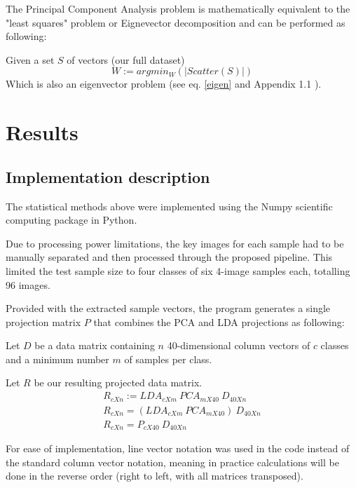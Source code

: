 \documentclass{bmvc2k}
\begin{document}
The Principal Component Analysis problem is mathematically equivalent to the "least squares" problem or Eignevector decomposition and can be performed as following:

Given a set $S$ of vectors (our full dataset)
\begin{equation}
   W := argmin_W(|Scatter(S)|)
\end{equation}
Which is also an eigenvector problem (see eq. \ref{eigen} and Appendix 1.1 \cite{appendix}).

\section{Results}

\subsection{Implementation description}

The statistical methods above were implemented using the Numpy\cite{numpy} scientific computing package in Python.

Due to processing power limitations, the key images for each sample had to be manually separated and then processed through the proposed pipeline. This limited the test sample size to four classes of six 4-image samples each, totalling 96 images.

Provided with the extracted sample vectors, the program generates a single projection matrix $P$ that combines the PCA and LDA projections as following:

Let $D$ be a data matrix containing $n$ 40-dimensional column vectors of $c$ classes and a minimum number $m$ of samples per class.

Let $R$ be our resulting projected data matrix.
\begin{equation}
   \begin{split}
      R_{cXn} := LDA_{cXm} \ PCA_{mX40} \ D_{40Xn}\\
      R_{cXn} = (LDA_{cXm}\ PCA_{mX40})\ D_{40Xn}\\
      R_{cXn} = P_{cX40}\ D_{40Xn}
   \end{split}
\end{equation}

For ease of implementation, line vector notation was used in the code instead of the standard column vector notation, meaning in practice calculations will be done in the reverse order (right to left, with all matrices transposed).
\end{document}
